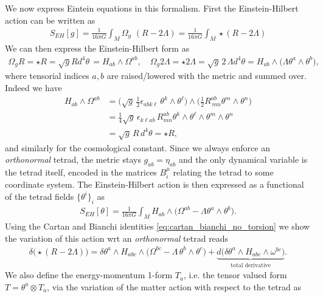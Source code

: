 \documentclass[../geometry_main.tex]{subfiles}
\begin{document}
We now express Eintein equations in this formalism.
First the Einstein-Hilbert action can be written as
\begin{align}
    S_{EH}[g] = \frac{1}{16\pi G}\int_M \Omega_g\,\,(R-2\Lambda) 
    = \frac{1}{16\pi G}\int_M \star (R-2\Lambda) 
\end{align}
We can then express the Einstein-Hilbert form as
\begin{align}
    \Omega_g R = \star R = \sqrt{g} R d^4\theta\, = H_{ab}\wedge \Omega^{ab},\quad \Omega_g 2\Lambda = \star 2\Lambda = \sqrt{g}\, 2\,\Lambda d^4\theta = H_{ab}\wedge \Big( \Lambda \theta^a \wedge \theta^b\Big),
\end{align}
where tensorial indices $a,b$ are raised/lowered with the metric and summed over.
Indeed we have
\begin{align}
    H_{ab}\wedge \Omega^{ab} &= \Big( \sqrt{g}\, \tfrac12 \epsilon_{abk\ell}\, \theta^k \wedge \theta^\ell\Big) \wedge \Big( \tfrac{1}{2} R^{ab}_{\,mn} \theta^m \wedge \theta^n\Big)\\
    &=\tfrac14 \sqrt{g}\,\epsilon_{k\ell ab}\, R^{ab}_{mn} \theta^k\wedge\theta^\ell\wedge\theta^m\wedge \theta^n\\
    &= \sqrt{g}\, R\, d^4\theta = \star R,
\end{align}
and similarly for the cosmological constant.
Since we always enforce an \emph{orthonormal} tetrad, the metric stays $g_{ab}=\eta_{ab}$ and the only dynamical variable is the tetrad itself, encoded in the matrices $B_i^\mu$ relating the tetrad to some coordinate system.
The Einstein-Hilbert action is then expressed as a functional of the tetrad fields $\{\theta^i\}_i$ as
\begin{align}
    S_{EH}[\theta] = \frac{1}{16\pi G}\int_M H_{ab}\wedge \Big( \Omega^{ab} - \Lambda \theta^a \wedge \theta^b\Big).
\end{align}
Using the Cartan and Bianchi identities \eqref{eq:cartan_bianchi_no_torsion} we show the variation of this action wrt an \emph{orthonormal} tetrad reads
\begin{align}
    \delta\big(\star (R-2\Lambda) \big)= \delta \theta^a \wedge H_{abc}\wedge \Big( \Omega^{bc} - \Lambda \,\theta^b \wedge \theta^c\Big) + \underbrace{d\Big( \delta \theta^a \wedge H_{abc} \wedge \omega^{bc}\Big)}_{\text{total derivative}}.
\end{align}
We also define the energy-momentum 1-form $T_a$, i.e. the tensor valued form $T=\theta^a\otimes T_a$, via the variation of the matter action with respect to the tetrad as
\end{document}

